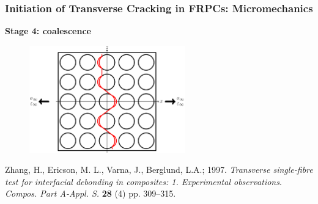 \documentclass[first,firstsupp,lastsupp,last,hyperref,table]{ETHclass}
\begin{document}
\begin{frame}
\frametitle{\vspace{0.2cm}\small Initiation of Transverse Cracking in FRPCs: Micromechanics}
\vspace{-0.75cm}
\centering
\begin{alertblock}{\centering\scriptsize\bf Stage 4: coalescence}
\begin{figure}
\centering
\includegraphics[width=0.6\textwidth]{stage4-coalescence.pdf}
\end{figure}
\end{alertblock}
\vspace{-0.5cm}
{\tiny Zhang, H., Ericson, M. L., Varna, J., Berglund, L.A.; 1997. {\em\tiny Transverse single-fibre test for interfacial debonding in composites: 1. Experimental observations}. {\it\tiny Compos. Part A-Appl. S.} {\bf\tiny 28} (4) pp. 309--315.}
\end{frame}
\end{document}
